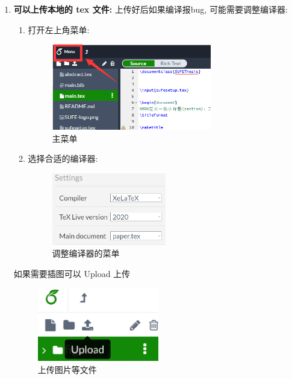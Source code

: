 \documentclass{formatBook}
\begin{document}
\begin{enumerate}
    \item
          \textbf{可以上传本地的 tex 文件:} 上传好后如果编译报bug, 可能需要调整编译器:
          \begin{enumerate}
              \item 打开左上角菜单:
                    \begin{figure}[H]
                        \centering
                        \includegraphics[width=0.7\textwidth]{Guidepics/20210415184001.png}
                        \caption{主菜单}
                    \end{figure}
              \item 选择合适的编译器:
                    \begin{figure}[H]
                        \centering
                        \includegraphics[width=0.5\textwidth]{Guidepics/20210415183957.png}
                        \caption{调整编译器的菜单}
                    \end{figure}
          \end{enumerate}

          如果需要插图可以 Upload 上传

          \begin{figure}[H]
              \centering
              \includegraphics[width=0.5\textwidth]{Guidepics/20210415185926.png}
              \caption{上传图片等文件}
          \end{figure}


\end{enumerate}
\end{document}
